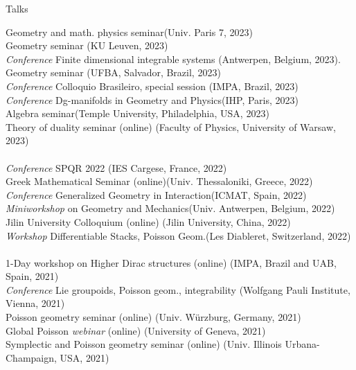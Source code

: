 \documentclass[12p]{resume}
\begin{document}
\begin{category}{Talks}
\begin{tabbing}
Geometry and math. physics seminar\>(Univ. Paris 7, 2023)\\%
Geometry seminar \>(KU Leuven, 2023)\\%
\emph{Conference}  Finite dimensional integrable systems\>  (Antwerpen, Belgium, 2023). \\%
Geometry seminar \>(UFBA, Salvador, Brazil, 2023)\\%
\emph{Conference} Colloquio Brasileiro, special session\> (IMPA, Brazil, 2023)\\%
\emph{Conference}  Dg-manifolds in Geometry and Physics\>(IHP, Paris, 2023)\\%
Algebra seminar\>(Temple University, Philadelphia, USA, 2023)\\%
Theory of duality seminar (online) \>(Faculty of Physics, University of Warsaw, 2023)\\%
\>\\

\emph{Conference} SPQR 2022\>  (IES Cargese, France, 2022)\\%
Greek Mathematical Seminar (online)\>(Univ. Thessaloniki, Greece, 2022)\\%
\emph{Conference} Generalized Geometry in Interaction\>(ICMAT, Spain, 2022)\\%
\emph{Miniworkshop} on Geometry and Mechanics\>(Univ. Antwerpen, Belgium, 2022)\\%
 Jilin University Colloquium (online)\> (Jilin University, China, 2022)\\%
\emph{Workshop} Differentiable Stacks, Poisson Geom.\>(Les Diableret, Switzerland, 2022)\\%
\>\\

1-Day  workshop on Higher Dirac structures (online)
\>(IMPA, Brazil and UAB, Spain, 2021)\\%
\emph{Conference} Lie groupoids, Poisson geom., integrability \>(Wolfgang Pauli Institute, Vienna, 2021)\\%
Poisson geometry seminar (online) \>(Univ. W\"urzburg, Germany, 2021)\\%
 Global Poisson \emph{webinar} (online) \> (University of Geneva, 2021)\\ 
 Symplectic and Poisson geometry seminar (online) \>(Univ. Illinois   Urbana-Champaign, USA, 2021)\\%
\>\\


\end{tabbing}
\end{category}
\end{document}
